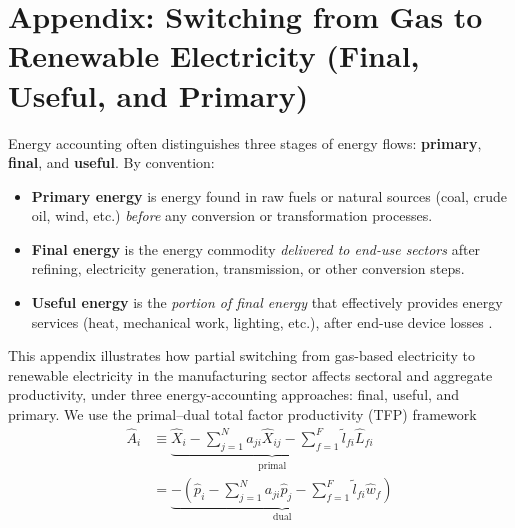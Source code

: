 \documentclass[11pt]{article}
\begin{document}
\begin{abstract}
    Under consistent input--output national accounting (with fixed shares $a_{ji}$), partial substitution of gas-based electricity by renewables in manufacturing does not alter aggregate TFP growth, regardless of whether energy flows are measured in final, useful, or primary form. 
    Using the $\zeta$-framework created in this paper, considering primary, final or useful energy does not change  TFP growth - except when primary energy is analysed within a broad energy sector that includes both electricity and fossil fuels.
Except for this one case: electrification and the switch from fossil to renewables has no impact on productivity
\[
   \hat{A}=0.
\]

In the CCC approach we are unfortunately in the ``exception'' case where a single energy sector sells both MWh of primary fossil fuel and electricity (both from renewables and fossil fuel). \textbf{This is why the best approach is to use useful energy.}
\end{abstract}


\section{Appendix: Switching from Gas to Renewable Electricity (Final, Useful, and Primary)}
\label{appendix_gas_renewables}

Energy accounting often distinguishes three stages of energy flows: \textbf{primary}, \textbf{final}, and \textbf{useful}. By convention:

\begin{itemize} \item \textbf{Primary energy} is energy found in raw fuels or natural sources (coal, crude oil, wind, etc.) \emph{before} any conversion or transformation processes. \item \textbf{Final energy} is the energy commodity \emph{delivered to end-use sectors} after refining, electricity generation, transmission, or other conversion steps. \item \textbf{Useful energy} is the \emph{portion of final energy} that effectively provides energy services (heat, mechanical work, lighting, etc.), after end-use device losses \citep{wayEmpiricallyGroundedTechnology2022}. \end{itemize}

This appendix illustrates how partial switching from gas-based electricity to renewable electricity in the manufacturing sector affects sectoral and aggregate productivity, under three energy-accounting approaches: final, useful, and primary.  We use the primal--dual total factor productivity (TFP) framework
\begin{subequations}
\begin{align}
\hat{A}_i  &\equiv  
\underbrace{\hat{X}_i  -  \sum_{j=1}^N a_{ji} \hat{X}_{ij}  -  \sum_{f=1}^F \tilde{l}_{fi} \hat{L}_{fi}}_{\text{primal}}
\label{eq:primal_appendix}\\
 &= 
\underbrace{-\left( \hat{p}_i  -  \sum_{j=1}^N a_{ji} \hat{p}_j  -  \sum_{f=1}^F \tilde{l}_{fi} \hat{w}_f \right)}_{\text{dual}}
\label{eq:dual_appendix}
\end{align}
\end{subequations}
\end{document}
